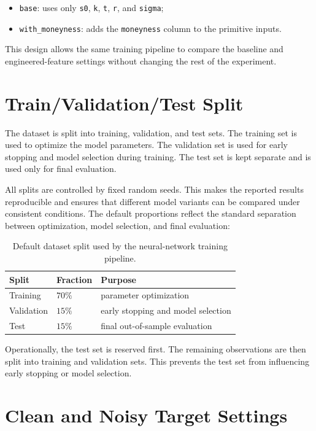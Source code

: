 \begin{itemize}
    \item \texttt{base}: uses only \texttt{s0}, \texttt{k}, \texttt{t}, \texttt{r}, and \texttt{sigma};
    \item \texttt{with\_moneyness}: adds the \texttt{moneyness} column to the primitive inputs.
\end{itemize}
This design allows the same training pipeline to compare the baseline and engineered-feature settings without changing the rest of the experiment.

\section{Train/Validation/Test Split}

The dataset is split into training, validation, and test sets.
The training set is used to optimize the model parameters.
The validation set is used for early stopping and model selection during training.
The test set is kept separate and is used only for final evaluation.

All splits are controlled by fixed random seeds.
This makes the reported results reproducible and ensures that different model variants can be compared under consistent conditions.
The default proportions reflect the standard separation between optimization, model selection, and final evaluation:

\begin{table}[H]
    \centering
    \begin{tabular}{lll}
        \toprule
        Split & Fraction & Purpose \\
        \midrule
        Training & $70\%$ & parameter optimization \\
        Validation & $15\%$ & early stopping and model selection \\
        Test & $15\%$ & final out-of-sample evaluation \\
        \bottomrule
    \end{tabular}
    \caption{Default dataset split used by the neural-network training pipeline.}
    \label{tab:data-split}
\end{table}

Operationally, the test set is reserved first.
The remaining observations are then split into training and validation sets.
This prevents the test set from influencing early stopping or model selection.

\section{Clean and Noisy Target Settings}

